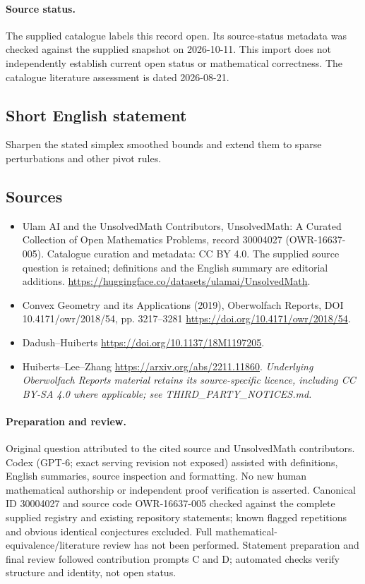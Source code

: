 \documentclass[11pt]{article}
\begin{document}
\paragraph{Source status.}
The supplied catalogue labels this record open. Its source-status metadata was checked against the supplied snapshot on 2026-10-11. This import does not independently establish current open status or mathematical correctness. The catalogue literature assessment is dated 2026-08-21.
\subsection{Short English statement}
Sharpen the stated simplex smoothed bounds and extend them to sparse perturbations and other pivot rules.
\subsection{Sources}
\begin{itemize}
\item[\hypertarget{source:30004027:1}{S1}] Ulam AI and the UnsolvedMath Contributors, UnsolvedMath: A Curated Collection of Open Mathematics Problems, record 30004027 (OWR-16637-005). Catalogue curation and metadata: CC BY 4.0. The supplied source question is retained; definitions and the English summary are editorial additions.
\url{https://huggingface.co/datasets/ulamai/UnsolvedMath}.
\item[\hypertarget{source:30004027:2}{S2}] Convex Geometry and its Applications (2019), Oberwolfach Reports, DOI 10.4171/owr/2018/54, pp. 3217--3281
\url{https://doi.org/10.4171/owr/2018/54}.
\item[\hypertarget{source:30004027:3}{S3}] Dadush--Huiberts
\url{https://doi.org/10.1137/18M1197205}.
\item[\hypertarget{source:30004027:4}{S4}] Huiberts--Lee--Zhang
\url{https://arxiv.org/abs/2211.11860}.
\textit{Underlying Oberwolfach Reports material retains its source-specific licence, including CC BY-SA 4.0 where applicable; see THIRD\_PARTY\_NOTICES.md.}
\end{itemize}
\paragraph{Preparation and review.}
Original question attributed to the cited source and UnsolvedMath contributors. Codex (GPT-6; exact serving revision not exposed) assisted with definitions, English summaries, source inspection and formatting. No new human mathematical authorship or independent proof verification is asserted. Canonical ID 30004027 and source code OWR-16637-005 checked against the complete supplied registry and existing repository statements; known flagged repetitions and obvious identical conjectures excluded. Full mathematical-equivalence/literature review has not been performed. Statement preparation and final review followed contribution prompts C and D; automated checks verify structure and identity, not open status.
\label{end:30004027}
\end{document}
